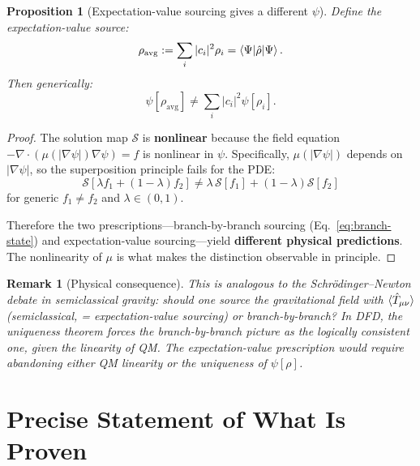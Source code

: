 \documentclass[aps,prd,twocolumn,superscriptaddress,nofootinbib]{revtex4-2}
\newtheorem{proposition}[theorem]{Proposition}
\newtheorem*{remark}{Remark}
\newcommand{\mufunction}{\mu}
\begin{document}
\begin{proposition}[Expectation-value sourcing gives a different $\psi$]\label{prop:nonlinear}
Define the expectation-value source:
\begin{equation}
\rho_{\mathrm{avg}} := \sum_i |c_i|^2 \rho_i = \braket{\Psi|\hat{\rho}|\Psi}.
\end{equation}
Then generically:
\begin{equation}
\psi[\rho_{\mathrm{avg}}] \neq \sum_i |c_i|^2 \psi[\rho_i].
\end{equation}
\end{proposition}

\begin{proof}
The solution map $\mathcal{S}$ is \textbf{nonlinear} because the field
equation $-\nabla\cdot(\mufunction(|\nabla\psi|)\nabla\psi) = f$ is
nonlinear in $\psi$. Specifically, $\mufunction(|\nabla\psi|)$ depends
on $|\nabla\psi|$, so the superposition principle fails for the PDE:
\begin{equation}
\mathcal{S}[\lambda f_1 + (1-\lambda)f_2] \neq
\lambda\,\mathcal{S}[f_1] + (1-\lambda)\mathcal{S}[f_2]
\end{equation}
for generic $f_1 \neq f_2$ and $\lambda \in (0,1)$.

Therefore the two prescriptions---branch-by-branch sourcing
(Eq.~\ref{eq:branch-state}) and expectation-value sourcing---yield
\textbf{different physical predictions}. The nonlinearity of $\mufunction$
is what makes the distinction observable in principle.
\end{proof}

\begin{remark}[Physical consequence]
This is analogous to the Schr\"odinger--Newton debate in semiclassical
gravity: should one source the gravitational field with $\braket{\hat{T}_{\mu\nu}}$
(semiclassical, = expectation-value sourcing) or branch-by-branch? In DFD,
the uniqueness theorem \emph{forces} the branch-by-branch picture as the
logically consistent one, given the linearity of QM. The expectation-value
prescription would require abandoning either QM linearity or the uniqueness
of $\psi[\rho]$.
\end{remark}

\section{Precise Statement of What Is Proven}
\end{document}
